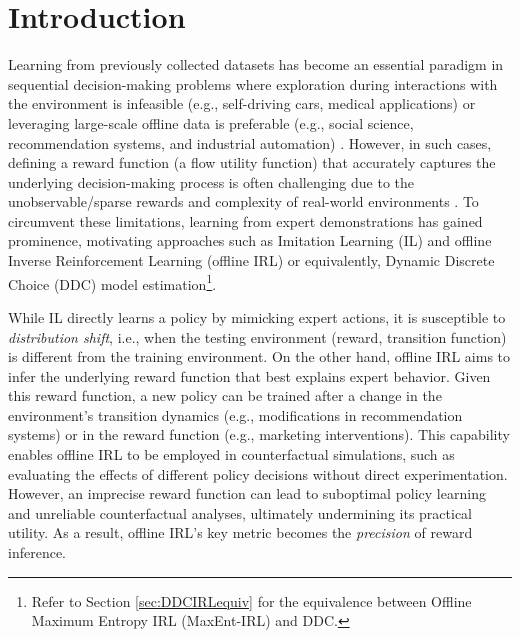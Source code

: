 
\section{Introduction}\label{sec:Intro}
Learning from previously collected datasets has become an essential paradigm in sequential decision-making problems where exploration during interactions with the environment is infeasible (e.g., self-driving cars, medical applications) or leveraging large-scale offline data is preferable (e.g., social science, recommendation systems, and industrial automation) \citep{levine2020offline}. However, in such cases, defining a reward function (a flow utility function) that accurately captures the underlying decision-making process is often challenging due to the unobservable/sparse rewards \citep{zolna2020offline} and complexity of real-world environments \citep{foster2021offline}. To circumvent these limitations, learning from expert demonstrations has gained prominence, motivating approaches such as Imitation Learning (IL) and offline Inverse Reinforcement Learning (offline IRL) or equivalently, Dynamic Discrete Choice (DDC) model estimation\footnote{Refer to Section \ref{sec:DDCIRLequiv} for the equivalence between Offline Maximum Entropy IRL (MaxEnt-IRL) and DDC.}.

While IL directly learns a policy by mimicking expert actions, it is susceptible to \textit{distribution shift}, i.e., when the testing environment (reward, transition function) is different from the training environment. On the other hand, offline IRL aims to infer the underlying reward function that best explains expert behavior. Given this reward function, a new policy can be trained after a change in the environment's transition dynamics (e.g., modifications in recommendation systems) or in the reward function (e.g., marketing interventions). This capability enables offline IRL to be employed in counterfactual simulations, such as evaluating the effects of different policy decisions without direct experimentation. However, an imprecise reward function can lead to suboptimal policy learning and unreliable counterfactual analyses, ultimately undermining its practical utility. As a result, offline IRL's key metric becomes the \textit{precision} of reward inference.%

